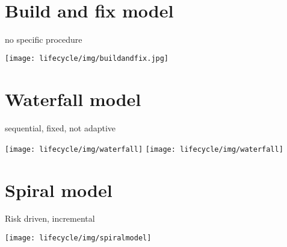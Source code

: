 \ifslides
\\
\else
\fi
%
\begin{minipage}[t]{0.35\linewidth}
\section{Build and fix model}
no specific procedure
\begin{center}
\texttt{[image: lifecycle/img/buildandfix.jpg]}
\end{center}
\end{minipage}
\hfill
%
\ifslides
\begin{minipage}[t]{0.5\linewidth}
\else
\begin{minipage}[t]{0.5\linewidth}
\fi
\section{Waterfall model}
sequential, fixed, not adaptive
\begin{center}
\ifslides
\texttt{[image: lifecycle/img/waterfall]}
\else
\texttt{[image: lifecycle/img/waterfall]}
\fi
\end{center}
\end{minipage}
\vspace{1cm}
\newpage
\section{Spiral model}
Risk driven, incremental
\begin{center}
\texttt{[image: lifecycle/img/spiralmodel]}
\end{center}
%

\end{minipage}
